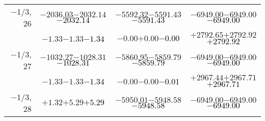\documentclass[compress]{beamer}
\begin{document}
\begin{frame}
{\begin{tabular}{r | c | c | c}
$-$1/3, 26 & $-2036.03$\hspace{0.1 cm}$-2032.14$\hspace{0.1 cm}\textcolor{black}{$-2032.14$} & $-5592.32$\hspace{0.1 cm}$-5591.43$\hspace{0.1 cm}\textcolor{black}{$-5591.43$} & $-6949.00$\hspace{0.1 cm}$-6949.00$\hspace{0.1 cm}\textcolor{black}{$-6949.00$} \\
           & $-1.33$\hspace{0.1 cm}$-1.33$\hspace{0.1 cm}\textcolor{black}{$-1.34$} & $-0.00$\hspace{0.1 cm}$+0.00$\hspace{0.1 cm}\textcolor{black}{$-0.00$} & $+2792.65$\hspace{0.1 cm}$+2792.92$\hspace{0.1 cm}\textcolor{black}{$+2792.92$} \\
$-$1/3, 27 & $-1032.27$\hspace{0.1 cm}$-1028.31$\hspace{0.1 cm}\textcolor{black}{$-1028.31$} & $-5860.95$\hspace{0.1 cm}$-5859.79$\hspace{0.1 cm}\textcolor{black}{$-5859.79$} & $-6949.00$\hspace{0.1 cm}$-6949.00$\hspace{0.1 cm}\textcolor{black}{$-6949.00$} \\
           & $-1.33$\hspace{0.1 cm}$-1.33$\hspace{0.1 cm}\textcolor{black}{$-1.34$} & $-0.00$\hspace{0.1 cm}$-0.00$\hspace{0.1 cm}\textcolor{black}{$-0.01$} & $+2967.44$\hspace{0.1 cm}$+2967.71$\hspace{0.1 cm}\textcolor{black}{$+2967.71$} \\
$-$1/3, 28 & $+1.32$\hspace{0.1 cm}$+5.29$\hspace{0.1 cm}\textcolor{black}{$+5.29$} & $-5950.01$\hspace{0.1 cm}$-5948.58$\hspace{0.1 cm}\textcolor{black}{$-5948.58$} & $-6949.00$\hspace{0.1 cm}$-6949.00$\hspace{0.1 cm}\textcolor{black}{$-6949.00$} \\

\end{tabular}}
\end{frame}
\end{document}
